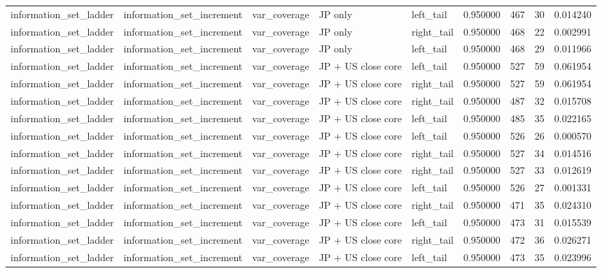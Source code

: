 \begin{tabular}{lllllrrr}
information\_set\_ladder & information\_set\_increment & var\_coverage & JP only & left\_tail & 0.950000 & 467 & 30 & 0.014240 \\
information\_set\_ladder & information\_set\_increment & var\_coverage & JP only & right\_tail & 0.950000 & 468 & 22 & 0.002991 \\
information\_set\_ladder & information\_set\_increment & var\_coverage & JP only & left\_tail & 0.950000 & 468 & 29 & 0.011966 \\
information\_set\_ladder & information\_set\_increment & var\_coverage & JP + US close core & left\_tail & 0.950000 & 527 & 59 & 0.061954 \\
information\_set\_ladder & information\_set\_increment & var\_coverage & JP + US close core & right\_tail & 0.950000 & 527 & 59 & 0.061954 \\
information\_set\_ladder & information\_set\_increment & var\_coverage & JP + US close core & right\_tail & 0.950000 & 487 & 32 & 0.015708 \\
information\_set\_ladder & information\_set\_increment & var\_coverage & JP + US close core & left\_tail & 0.950000 & 485 & 35 & 0.022165 \\
information\_set\_ladder & information\_set\_increment & var\_coverage & JP + US close core & left\_tail & 0.950000 & 526 & 26 & 0.000570 \\
information\_set\_ladder & information\_set\_increment & var\_coverage & JP + US close core & right\_tail & 0.950000 & 527 & 34 & 0.014516 \\
information\_set\_ladder & information\_set\_increment & var\_coverage & JP + US close core & right\_tail & 0.950000 & 527 & 33 & 0.012619 \\
information\_set\_ladder & information\_set\_increment & var\_coverage & JP + US close core & left\_tail & 0.950000 & 526 & 27 & 0.001331 \\
information\_set\_ladder & information\_set\_increment & var\_coverage & JP + US close core & right\_tail & 0.950000 & 471 & 35 & 0.024310 \\
information\_set\_ladder & information\_set\_increment & var\_coverage & JP + US close core & left\_tail & 0.950000 & 473 & 31 & 0.015539 \\
information\_set\_ladder & information\_set\_increment & var\_coverage & JP + US close core & right\_tail & 0.950000 & 472 & 36 & 0.026271 \\
information\_set\_ladder & information\_set\_increment & var\_coverage & JP + US close core & left\_tail & 0.950000 & 473 & 35 & 0.023996 \\

\end{tabular}
